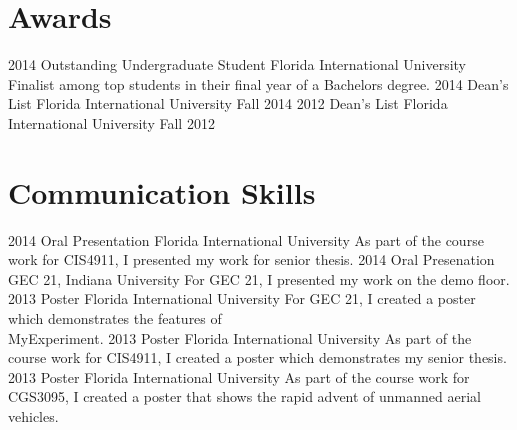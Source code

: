 \documentclass[print]{friggeri-cv} %
\begin{document}

\section{Awards}
\begin{entrylist}
\entry
{2014}
{Outstanding Undergraduate Student}
{Florida International University}
{Finalist among top students in their final year of a Bachelors degree.}
\entry
{2014}
{Dean's List}
{Florida International University}
{Fall 2014}
\entry
{2012}
{Dean's List}
{Florida International University}
{Fall 2012}
\end{entrylist}

\clearpage
\section{Communication Skills}
\begin{entrylist}
\entry
{2014}
{Oral Presentation}
{Florida International University}
{As part of the course work for CIS4911, I presented my work for senior thesis.}
\entry
{2014}
{Oral Presenation}
{GEC 21, Indiana University}
{For GEC 21, I presented my work on the demo floor.}
\entry
{2013}
{Poster}
{Florida International University}
{For GEC 21, I created a poster which demonstrates the features of \\MyExperiment.}
\entry
{2013}
{Poster}
{Florida International University}
{As part of the course work for CIS4911, I created a poster which demonstrates my senior thesis.}
\entry
{2013}
{Poster}
{Florida International University}
{As part of the course work for CGS3095, I created a poster that shows the rapid advent of unmanned aerial vehicles.}
\end{entrylist}
\end{document}
